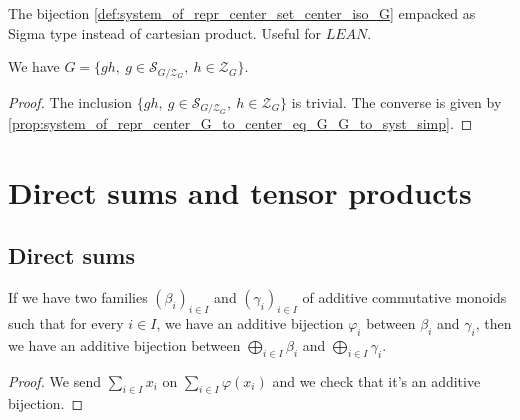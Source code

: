 \begin{definition}
    \label{def:system_of_repr_set_center_iso_G_sigma}
    \leanok
    The bijection \ref{def:system_of_repr_center_set_center_iso_G} empacked as Sigma type instead of cartesian product.
    Useful for $LEAN$.
\end{definition}

\begin{proposition}
    \label{prop:system_of_repr_center_set_center_eq_G }
    \leanok
    We have $G = \{gh,\ g\in \mathcal{S}_{G/\mathcal{Z}_G},\ h\in \mathcal{Z}_G\}$.
\end{proposition}
\begin{proof}
    \leanok
    The inclusion $\{gh,\ g\in \mathcal{S}_{G/\mathcal{Z}_G},\ h\in \mathcal{Z}_G\}$ is trivial.
    The converse is given by \ref{prop:system_of_repr_center_G_to_center_eq_G_G_to_syst_simp}.
\end{proof}


\section{Direct sums and tensor products}

\subsection{Direct sums}

\begin{definition}
    \label{def:DirectSum_equiv}
    \leanok
    If we have two families $(\beta_i)_{i\in I}$ and $(\gamma_i)_{i\in I}$ of additive commutative
    monoids such that for every $i\in I$, we have an additive bijection $\varphi_i$ between 
    $\beta_i$ and $\gamma_i$, then we have an additive bijection
    between $\bigoplus\limits_{i\in I}\beta_i$ and $\bigoplus\limits_{i\in I}\gamma_i$.
    \begin{proof}
        \leanok
        We send $\sum\limits_{i\in I}x_i$ on $\sum\limits_{i\in I}\varphi(x_i)$ and we check
        that it's an additive bijection. 
    \end{proof}
\end{definition}

